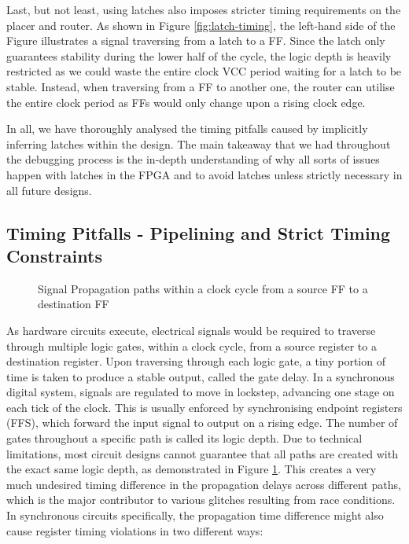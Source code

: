 \documentclass[a4paper]{report}
\begin{document}
Last, but not least, using latches also imposes stricter timing requirements on the placer and router. As shown in Figure \ref{fig:latch-timing}, the left-hand side of the Figure illustrates a signal traversing from a latch to a FF. Since the latch only guarantees stability during the lower half of the cycle, the logic depth is heavily restricted as we could waste the entire clock VCC period waiting for a latch to be stable. Instead, when traversing from a FF to another one, the router can utilise the entire clock period as FFs would only change upon a rising clock edge.

In all, we have thoroughly analysed the timing pitfalls caused by implicitly inferring latches within the design. The main takeaway that we had throughout the debugging process is the in-depth understanding of why all sorts of issues happen with latches in the FPGA and to avoid latches unless strictly necessary in all future designs.

\subsection{Timing Pitfalls - Pipelining and Strict Timing Constraints}
\label{section:implementation-hardware-implementation-timing}

\begin{figure}[h!]
  \caption{Signal Propagation paths within a clock cycle from a source FF to a destination FF}
  \label{fig:timing-path}
\end{figure}

As hardware circuits execute, electrical signals would be required to traverse through multiple logic gates, within a clock cycle, from a source register to a destination register. Upon traversing through each logic gate, a tiny portion of time is taken to produce a stable output, called the gate delay. In a synchronous digital system, signals are regulated to move in lockstep, advancing one stage on each tick of the clock. This is usually enforced by synchronising endpoint registers (FFS), which forward the input signal to output on a rising edge. The number of gates throughout a specific path is called its logic depth. Due to technical limitations, most circuit designs cannot guarantee that all paths are created with the exact same logic depth, as demonstrated in Figure \ref{fig:timing-path}. This creates a very much undesired timing difference in the propagation delays across different paths, which is the major contributor to various glitches resulting from race conditions. In synchronous circuits specifically, the propagation time difference might also cause register timing violations in two different ways:
\end{document}
